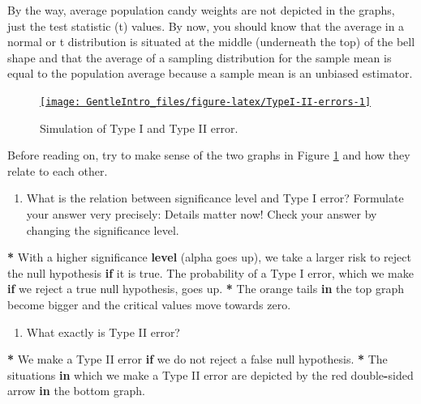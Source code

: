 \documentclass[a4paper]{book}
\newenvironment{Shaded}{\begin{snugshade}}{\end{snugshade}}
\newcommand{\KeywordTok}[1]{\textcolor[rgb]{0,0,0}{\textbf{#1}}}
\newcommand{\StringTok}[1]{\textcolor[rgb]{0.00,0.00,0.00}{#1}}
\newcommand{\ControlFlowTok}[1]{\textcolor[rgb]{0.00,0.00,0.00}{\textbf{#1}}}
\newcommand{\OperatorTok}[1]{\textcolor[rgb]{0.00,0.00,0.00}{\textbf{#1}}}
\newcommand{\NormalTok}[1]{#1}
\providecommand{\tightlist}{%
  \setlength{\itemsep}{0pt}\setlength{\parskip}{0pt}}
\theoremstyle{definition}
\theoremstyle{definition}
\theoremstyle{definition}
\theoremstyle{remark}
\begin{document}
By the way, average population candy weights are not depicted in the
graphs, just the test statistic (t) values. By now, you should know that
the average in a normal or t distribution is situated at the middle
(underneath the top) of the bell shape and that the average of a
sampling distribution for the sample mean is equal to the population
average because a sample mean is an unbiased estimator.

\begin{figure}[H]
\href{http://82.196.4.233:3838/apps/type1vs2/}{\texttt{[image: GentleIntro\_files/figure-latex/TypeI-II-errors-1]} }\caption{Simulation of Type I and Type II error.}\label{fig:TypeI-II-errors}
\end{figure}

Before reading on, try to make sense of the two graphs in Figure
\ref{fig:TypeI-II-errors} and how they relate to each other.

\begin{enumerate}
\def\labelenumi{\arabic{enumi}.}
\tightlist
\item
  What is the relation between significance level and Type I error?
  Formulate your answer very precisely: Details matter now! Check your
  answer by changing the significance level.
\end{enumerate}

\begin{Shaded}
\begin{Highlighting}[]
\OperatorTok{*}\StringTok{ }\NormalTok{With a higher significance }\KeywordTok{level}\NormalTok{ (alpha goes up), we take a larger risk to}
\NormalTok{reject the null hypothesis }\ControlFlowTok{if}\NormalTok{ it is true. The probability of a Type I error,}
\NormalTok{which we make }\ControlFlowTok{if}\NormalTok{ we reject a true null hypothesis, goes up.}
\OperatorTok{*}\StringTok{ }\NormalTok{The orange tails }\ControlFlowTok{in}\NormalTok{ the top graph become bigger and the critical values move}
\NormalTok{towards zero.}
\end{Highlighting}
\end{Shaded}

\begin{enumerate}
\def\labelenumi{\arabic{enumi}.}
\setcounter{enumi}{1}
\tightlist
\item
  What exactly is Type II error?
\end{enumerate}

\begin{Shaded}
\begin{Highlighting}[]
\OperatorTok{*}\StringTok{ }\NormalTok{We make a Type II error }\ControlFlowTok{if}\NormalTok{ we do not reject a false null hypothesis.}
\OperatorTok{*}\StringTok{ }\NormalTok{The situations }\ControlFlowTok{in}\NormalTok{ which we make a Type II error are depicted by the red}
\NormalTok{double}\OperatorTok{-}\NormalTok{sided arrow }\ControlFlowTok{in}\NormalTok{ the bottom graph.}
\end{Highlighting}
\end{Shaded}
\end{document}
